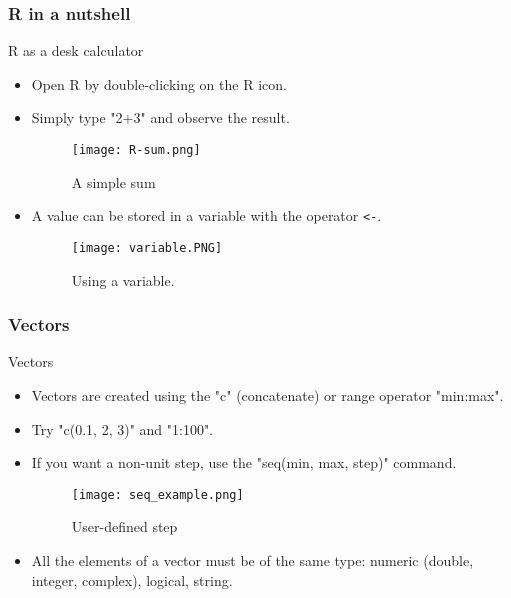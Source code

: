 \begin{frame}
    \frametitle{R in a nutshell}
\begin{block}{R as a desk calculator}
    \begin{itemize}
        \item<+-> Open R by double-clicking on the R icon.
        \item<+-> Simply type "2+3" and observe the result.
        \begin{figure}[htbp]
            \centering
            \texttt{[image: R-sum.png]}
            \caption{A simple sum}
            \label{<label>}
        \end{figure}
        \item<+-> A value  can be stored in
        a variable with the operator \texttt{<-}.
        \begin{figure}[htbp]
            \centering
            \texttt{[image: variable.PNG]}
            \caption{Using a variable.}
            \label{fig:variable}
        \end{figure}
    \end{itemize}
\end{block}
\end{frame}
\begin{frame}
    \frametitle{Vectors}
\begin{block}{Vectors}
    \begin{itemize}
        \item<+-> Vectors are created using the "c" (concatenate) or range operator "min:max".
        \item<+-> Try "c(0.1, 2, 3)" and "1:100".
        \item<+-> If you want a non-unit step, use the "seq(min, max, step)" command.
        \begin{figure}[htbp]
            \centering
            \texttt{[image: seq\_example.png]}
            \caption{User-defined step}
            \label{fig:arbitrary_range}
        \end{figure}
        \item<+-> All the elements of a vector must be of the same type:
        numeric (double, integer, complex), logical, string.
    \end{itemize}
\end{block}
\end{frame}
